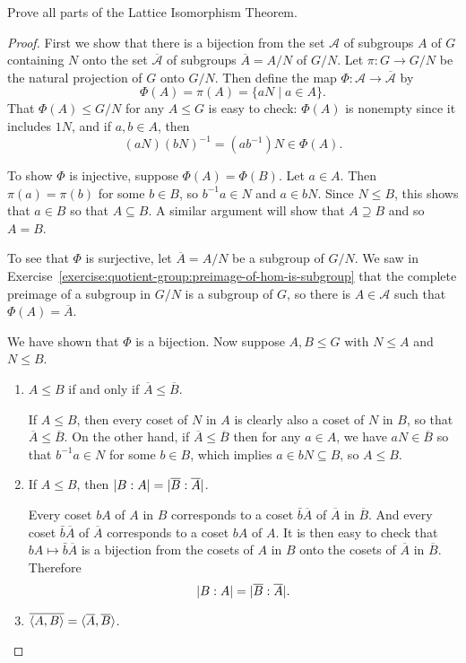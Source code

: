  Prove all parts of the Lattice Isomorphism Theorem.
\begin{proof}
  First we show that there is a bijection from the set $\mathcal{A}$
  of subgroups $A$ of $G$ containing $N$ onto the set
  $\overline{\mathcal{A}}$ of subgroups $\overline{A} = A/N$ of
  $G/N$. Let $\pi\colon G\to G/N$ be the natural projection of $G$
  onto $G/N$. Then define the map
  $\Phi\colon\mathcal{A}\to\overline{\mathcal{A}}$ by
  \begin{equation*}
    \Phi(A) = \pi(A) = \{aN \mid a\in A\}.
  \end{equation*}
  That $\Phi(A)\leq G/N$ for any $A\leq G$ is easy to check: $\Phi(A)$
  is nonempty since it includes $1N$, and if $a,b\in A$, then
  \begin{equation*}
    (aN)(bN)^{-1} = (ab^{-1})N\in\Phi(A).
  \end{equation*}

  To show $\Phi$ is injective, suppose $\Phi(A) = \Phi(B)$. Let
  $a\in A$. Then $\pi(a) = \pi(b)$ for some $b\in B$, so
  $b^{-1}a\in N$ and $a\in bN$. Since $N\leq B$, this shows that
  $a\in B$ so that $A\subseteq B$. A similar argument will show that
  $A\supseteq B$ and so $A = B$.

  To see that $\Phi$ is surjective, let $\overline{A} = A/N$ be a
  subgroup of $G/N$. We saw in
  Exercise~\ref{exercise:quotient-group:preimage-of-hom-is-subgroup}
  that the complete preimage of a subgroup in $G/N$ is a subgroup of
  $G$, so there is $A\in\mathcal{A}$ such that
  $\Phi(A) = \overline{A}$.

  We have shown that $\Phi$ is a bijection. Now suppose $A,B\leq G$
  with $N\leq A$ and $N\leq B$.
  \begin{enumerate}
  \item $A\leq B$ if and only if $\overline{A}\leq\overline{B}$.

    If $A\leq B$, then every coset of $N$ in $A$ is clearly also a
    coset of $N$ in $B$, so that $\overline{A}\leq\overline{B}$. On
    the other hand, if $\overline{A}\leq\overline{B}$ then for any
    $a\in A$, we have $aN\in\overline{B}$ so that $b^{-1}a\in N$ for
    some $b\in B$, which implies $a\in bN\subseteq B$, so $A\leq B$.
  \item If $A\leq B$, then
    $\lvert{B:A}\rvert = \lvert{\overline{B}:\overline{A}}\rvert$.

    Every coset $bA$ of $A$ in $B$ corresponds to a coset
    $\bar{b}\overline{A}$ of $\overline{A}$ in $\overline{B}$. And
    every coset $\bar{b}\overline{A}$ of $\overline{A}$ corresponds to
    a coset $bA$ of $A$. It is then easy to check that
    $bA\mapsto\bar{b}\overline{A}$ is a bijection from the cosets of
    $A$ in $B$ onto the cosets of $\overline{A}$ in
    $\overline{B}$. Therefore
    \begin{equation*}
      \lvert{B:A}\rvert = \lvert{\overline{B}:\overline{A}}\rvert.
    \end{equation*}
  \item $\overline{\langle{A, B}\rangle} = \langle{\overline{A}, \overline{B}}\rangle$.


\end{enumerate}
\end{proof}
